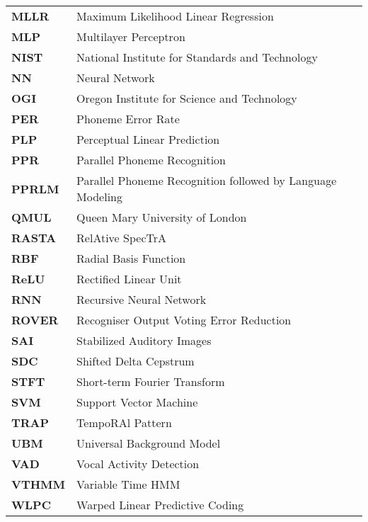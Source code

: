 \begin{longtable}{p{} p{}}
\textbf{MLLR} & Maximum Likelihood Linear Regression\\
\textbf{MLP} & Multilayer Perceptron\\
\textbf{NIST} & National Institute for Standards and Technology\\
\textbf{NN} & Neural Network\\
\textbf{OGI} & Oregon Institute for Science and Technology\\
\textbf{PER} & Phoneme Error Rate\\
\textbf{PLP} & Perceptual Linear Prediction\\
\textbf{PPR} & Parallel Phoneme Recognition\\
\textbf{PPRLM} & Parallel Phoneme Recognition followed by Language Modeling\\
\textbf{QMUL} & Queen Mary University of London\\
\textbf{RASTA} & RelAtive SpecTrA\\
\textbf{RBF} & Radial Basis Function\\
\textbf{ReLU} & Rectified Linear Unit\\
\textbf{RNN} & Recursive Neural Network\\
\textbf{ROVER} & Recogniser Output Voting Error Reduction\\
\textbf{SAI} & Stabilized Auditory Images\\
\textbf{SDC} & Shifted Delta Cepstrum\\
\textbf{STFT} & Short-term Fourier Transform\\
\textbf{SVM} & Support Vector Machine\\
\textbf{TRAP} & TempoRAl Pattern\\
\textbf{UBM} & Universal Background Model\\
\textbf{VAD} & Vocal Activity Detection\\
\textbf{VTHMM} & Variable Time HMM\\
\textbf{WLPC} & Warped Linear Predictive Coding\\

\end{longtable}
